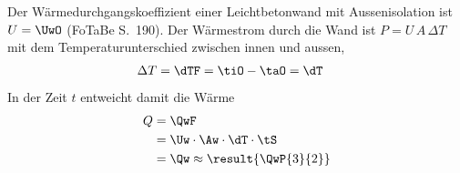 Der Wärmedurchgangskoeffizient einer Leichtbetonwand mit Aussenisolation ist $U = \UwO$ (FoTaBe S.~190). Der Wärmestrom durch die Wand ist $P = U\,A\,\Delta T$ mit dem Temperaturunterschied zwischen innen und aussen,
\begin{align}
 \Delta T &= \dTF = \tiO-\taO = \dT
\end{align}
In der Zeit $t$ entweicht damit die Wärme
\begin{align}
 Q &= \QwF \\
   &= \Uw\cdot\Aw\cdot\dT\cdot\tS \\
   &= \Qw \approx \result{\QwP{3}{2}}
\end{align}
